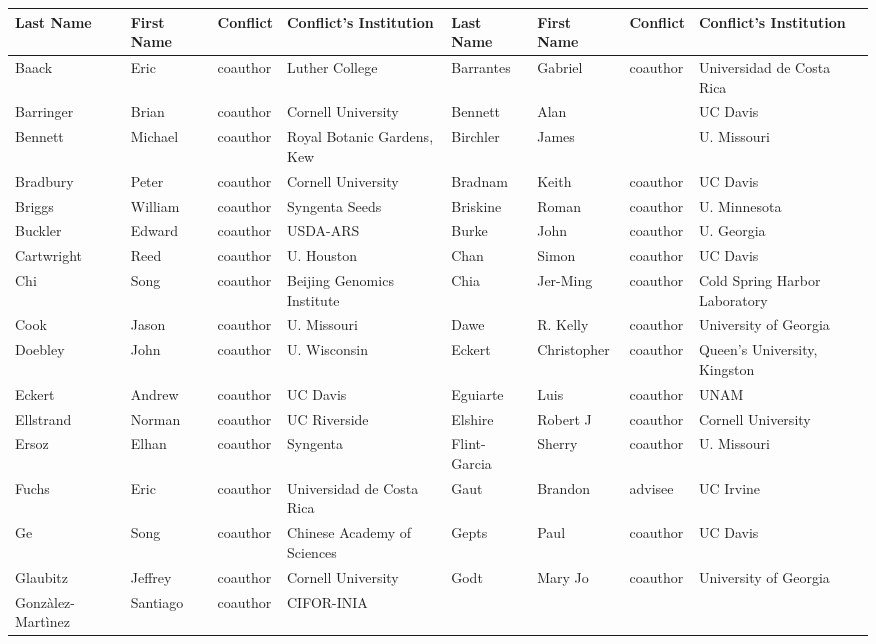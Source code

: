 \documentclass[11pt]{article}
\begin{document}
\begin{tiny}
\begin{tabular}{ l l l l l l l l }
{Last Name} & {First Name} & {Conflict} & {Conflict's Institution}  & {Last Name} & {First Name} & {Conflict} & {Conflict's Institution}  \\
\hline
Baack &  Eric & coauthor   & Luther College  & Barrantes &  Gabriel & coauthor   & Universidad de Costa Rica \\ 
Barringer &  Brian & coauthor   & Cornell University &
Bennett & Alan &    & UC Davis \\ 
Bennett &  Michael & coauthor   & Royal Botanic Gardens, Kew &
Birchler &  James &    & U. Missouri \\ 
Bradbury & Peter & coauthor   & Cornell University &
Bradnam & Keith & coauthor & UC Davis \\ 
Briggs & William  & coauthor   & Syngenta Seeds &
Briskine & Roman & coauthor   & U. Minnesota \\ 
Buckler & Edward & coauthor   & USDA-ARS &
Burke & John & coauthor   & U. Georgia \\ 
Cartwright &  Reed & coauthor   & U. Houston &
Chan & Simon & coauthor & UC Davis \\ 
Chi & Song & coauthor   & Beijing Genomics Institute &
Chia & Jer-Ming & coauthor   & Cold Spring Harbor Laboratory \\ 
Cook & Jason & coauthor   & U. Missouri &
Dawe & R. Kelly & coauthor   & University of Georgia \\ 
Doebley & John & coauthor   & U. Wisconsin &
Eckert &  Christopher & coauthor   & Queen's University, Kingston \\ 
Eckert & Andrew & coauthor   & UC Davis &
Eguiarte & Luis & coauthor   & UNAM \\ 
Ellstrand &  Norman & coauthor   & UC Riverside &
Elshire & Robert J & coauthor   & Cornell University \\ 
Ersoz & Elhan & coauthor   & Syngenta &
Flint-Garcia & Sherry & coauthor   & U. Missouri \\ 
Fuchs &  Eric & coauthor   & Universidad de Costa Rica &
Gaut &  Brandon & advisee & UC Irvine \\ 
Ge &  Song & coauthor   & Chinese Academy of Sciences &
Gepts & Paul & coauthor   & UC Davis \\ 
Glaubitz & Jeffrey & coauthor   & Cornell University &
Godt &  Mary Jo & coauthor   & University of Georgia \\ 
Gonz\`alez-Mart\`inez & Santiago & coauthor   & CIFOR-INIA &

\end{tabular}
\end{tiny}
\end{document}
